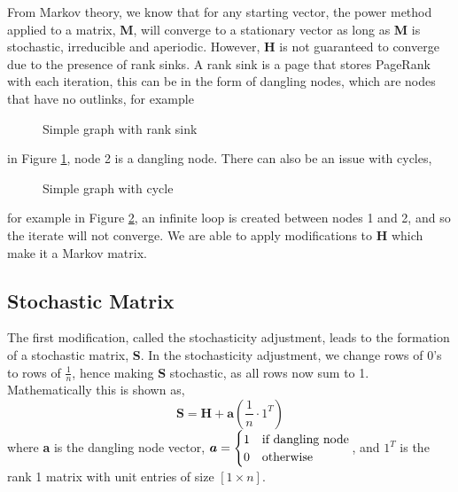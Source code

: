 \documentclass[11pt]{report}
\begin{document}
From Markov theory, we know that for any starting vector, the power method applied to a matrix, \textbf{M},  will converge to a stationary vector as long as \textbf{M} is stochastic, irreducible and aperiodic. However, \textbf{H} is not guaranteed to converge due to the presence of rank sinks. A rank sink is a page that stores PageRank with each iteration, this can be in the form of dangling nodes, which are nodes that have no outlinks, for example 
\begin{figure}[h]
\centering
{} \caption{Simple graph with rank sink} \label{fig:dangling} 
\end{figure} in Figure \ref{fig:dangling}, node 2 is a dangling node. There can also be an issue with cycles,
\begin{figure}[h]
\centering
{} \caption{Simple graph with cycle} \label{fig:cycle}
\end{figure} for example in Figure \ref{fig:cycle}, an infinite loop is created between nodes 1 and 2, and so the iterate will not converge. We are able to apply modifications to \textbf{H} which make it a Markov matrix.

\subsection{Stochastic Matrix} \label{sec:stoc}
The first modification, called the stochasticity adjustment, leads to the formation of a stochastic matrix, \textbf{S}. In the stochasticity adjustment, we change rows of 0's to rows of $\frac{1}{n}$, hence making \textbf{S} stochastic, as all rows now sum to 1. Mathematically this is shown as, \begin{equation} \label{eq:s}
\textbf{S} = \textbf{H} + \textbf{a}\left(\frac{1}{n}\cdot 1^{T}\right)
\end{equation} 
where \textbf{a} is the dangling node vector, \(\boldsymbol{a} = \begin{cases} 1 & \textnormal{if dangling node} \\ 0 & \textnormal{otherwise} \end{cases}\), and $1^T$ is the rank 1 matrix with unit entries of size $[1\times n]$.
\end{document}

